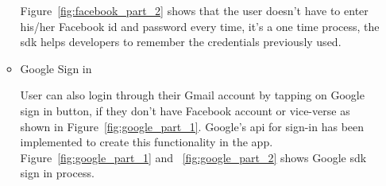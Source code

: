 \begin{itemize}
\begin{itemize}
        Figure~\ref{fig:facebook_part_2} shows that the user doesn't have to enter his/her Facebook id and password every time, it's a one time process, the \gls{sdk} helps developers to remember the credentials previously used.
        
      
        \item Google Sign in
        
        User can also login through their Gmail account by tapping on Google sign in button, if they don't have Facebook account or vice-verse as shown in Figure~\ref{fig:google_part_1}. Google's \gls{api} for sign-in has been implemented to create this functionality in the app. Figure~\ref{fig:google_part_1} and ~\ref{fig:google_part_2} shows Google \gls{sdk} sign in process. \\
        

\end{itemize}
\end{itemize}
